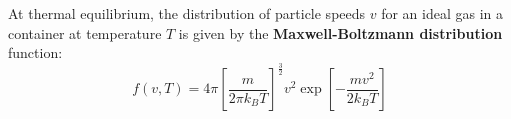 At thermal equilibrium, the distribution of particle speeds $v$ for an ideal
gas in a container at temperature $T$ is given by the
\textbf{Maxwell-Boltzmann distribution} function:
\begin{equation}
  f(v,T)=4\pi\left[\frac m{2\pi k_BT}\right]^{\frac32}v^2
  \exp\left[-\frac{mv^2}{2k_BT}\right]
\end{equation}
%
%
%
%
%  
%    
%  
%
%
%
%
%
%
%
%
